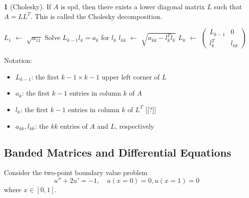 \documentclass[12pt]{article}
\theoremstyle{definition}
\newtheorem{theorem}{\color{ForestGreen}{\textbf{Theorem}}}
\newcommand{\R}{\mathbb{R}}
\newcommand*\Let[2]{\State #1 $\gets$ #2}
\theoremstyle{definition}
\begin{document}
\begin{theorem}[Cholesky]
If $A$ is spd, then there exists a lower diagonal matrix $L$ such that $A = L L^T$. This is called the Cholesky decomposition. 
\end{theorem}

\begin{algorithm}
  \caption{Cholesky Factorization}
  \begin{algorithmic}[ht]
    \Require{$A \in \R^{n \times n}$, SPD}
    \Let{$L_1$}{$\sqrt{a_{11}}$}
    	\State Solve $L_{k-1} l_k = a_k$ for $l_k$
    	\Let{$l_{kk}$}{$\sqrt{a_{kk} - l_k^T l_k}$}
    	\Let{$L_k$}{$\begin{pmatrix} L_{k-1} & 0 \\ l_k^T & l_{kk} \end{pmatrix}$}
    \EndFor
  \end{algorithmic}
\end{algorithm}
Notation:
\begin{itemize}
	\item $L_{k-1}$: the first $k-1 \times k-1$ upper left corner of $L$
	\item $a_k$: the first $k-1$ entries in column $k$ of $A$
	\item $l_k$: the first $k-1$ entries in column $k$ of $L^T$ [[?]]
	\item $a_{kk}, l_{kk}$: the $kk$ entries of $A$ and $L$, respectively
\end{itemize}

\subsection{Banded Matrices and Differential Equations}
Consider the two-point boundary value problem
\begin{equation}
	u'' + 2u' = -1, \quad u(x=0)=0, u(x=1)= 0
\end{equation}
where $x\in [0,1]$.
\end{document}
